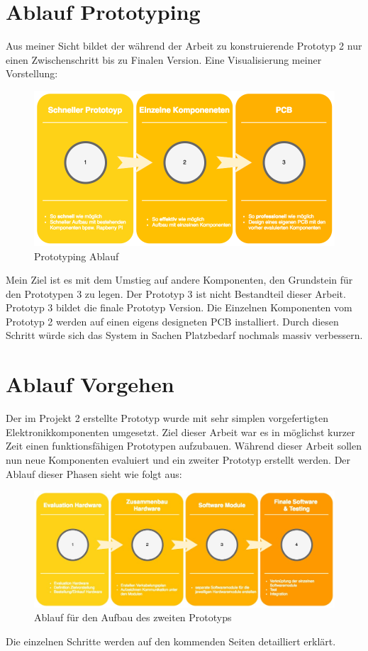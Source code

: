 \documentclass[11pt,english,german]{report}
\theoremstyle{definition}
\begin{document}
\section{Ablauf Prototyping}
Aus meiner Sicht bildet der während der Arbeit zu konstruierende Prototyp 2 nur einen Zwischenschritt bis zu Finalen Version. Eine Visualisierung meiner Vorstellung:\\
\begin{figure}[H]
	\centering
	\includegraphics[width=\textwidth]{img/projectFlow_Prototype.png}
	\caption[Prototyping Ablauf]
	{Prototyping Ablauf}
\end{figure}
\noindent
Mein Ziel ist es mit dem Umstieg auf andere Komponenten, den Grundstein für den Prototypen 3 zu legen. Der Prototyp 3 ist nicht Bestandteil dieser Arbeit. Prototyp 3 bildet die finale Prototyp Version. Die Einzelnen Komponenten vom Prototyp 2 werden auf einen eigens designeten PCB installiert. Durch diesen Schritt würde sich das System in Sachen Platzbedarf nochmals massiv verbessern.

\newpage
\section{Ablauf Vorgehen}
Der im Projekt 2 erstellte Prototyp wurde mit sehr simplen vorgefertigten Elektronikkomponenten umgesetzt. Ziel dieser Arbeit war es in möglichst kurzer Zeit einen funktionsfähigen Prototypen aufzubauen. Während dieser Arbeit sollen nun neue Komponenten evaluiert und ein zweiter Prototyp erstellt werden. Der Ablauf dieser Phasen sieht wie folgt aus:\\[0.3cm]

\begin{figure}[H]
	\centering
	\includegraphics[width=\textwidth]{img/projectFlow_hardware.jpg}
	\caption[Flowchart Prototyp 2]
	{Ablauf für den Aufbau des zweiten Prototyps}
\end{figure}
\noindent
Die einzelnen Schritte werden auf den kommenden Seiten detailliert erklärt.
\end{document}

